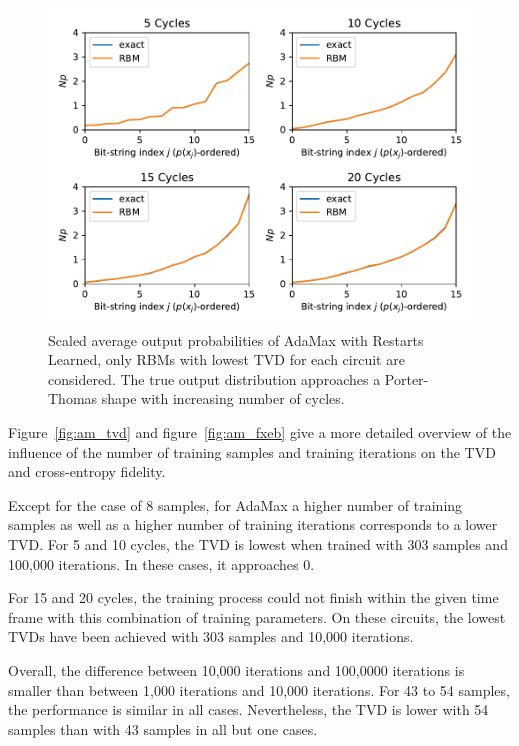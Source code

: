 \begin{figure}[H]
  \centering
  \includegraphics[width=\textwidth]{figures/results/AM-restarts-learned/avgBestPDF.pdf}
  \caption[Averaged best performing scaled output probabilities of AdaMax with Restarts Learned]{
    Scaled average output probabilities of AdaMax with Restarts Learned, only RBMs with lowest
    TVD for each circuit are considered. The true 
    output distribution approaches a Porter-Thomas shape with increasing number of cycles.}
  \label{fig:am_avgBestPDF}
\end{figure}

Figure~\ref{fig:am_tvd} and figure~\ref{fig:am_fxeb} give a more detailed overview of the influence of the 
number of training samples and training iterations on the TVD and cross-entropy fidelity.

Except for the case of 8 samples, for AdaMax a higher number of training samples as well as a higher 
number of training iterations corresponds to a lower TVD. For 5 and 10 cycles, the TVD is lowest
when trained with 303 samples and 100,000 iterations. In these cases, it approaches 0.

For 15 and 20 cycles, the training process could not finish
within the given time frame with this combination of training parameters. On these circuits, the lowest TVDs have been achieved with 303 samples 
and 10,000 iterations.

Overall, the difference between 10,000 iterations and 100,0000 iterations is smaller than between 
1,000 iterations and 10,000 iterations. For 43 to 54 samples, the performance is similar in all cases.
Nevertheless, the TVD is lower with 54 samples than with 43 samples in all but one cases.

